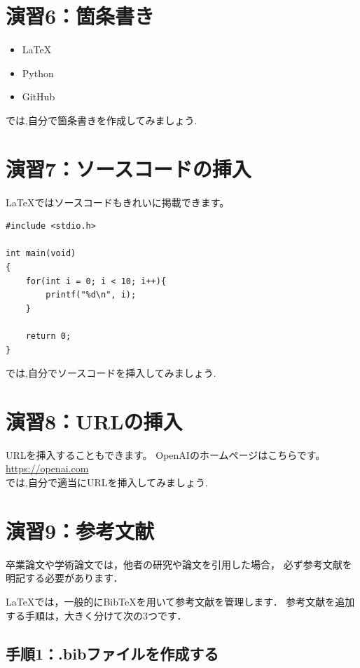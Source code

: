 \documentclass[a4paper,twocolumn]{jsarticle}
\begin{document}
\section*{演習6：箇条書き}
\begin{itemize}
    \item LaTeX
    \item Python
    \item GitHub
\end{itemize}
では,自分で箇条書きを作成してみましょう.\\
\section*{演習7：ソースコードの挿入}

LaTeXではソースコードもきれいに掲載できます。

\begin{lstlisting}
#include <stdio.h>

int main(void)
{
    for(int i = 0; i < 10; i++){
        printf("%d\n", i);
    }

    return 0;
}
\end{lstlisting}
では,自分でソースコードを挿入してみましょう.\\
\section*{演習8：URLの挿入}
URLを挿入することもできます。
OpenAIのホームページはこちらです。\\
\url{https://openai.com}\\
では,自分で適当にURLを挿入してみましょう.\\
\section*{演習9：参考文献}

卒業論文や学術論文では，他者の研究や論文を引用した場合，
必ず参考文献を明記する必要があります．

LaTeXでは，一般的にBibTeXを用いて参考文献を管理します．
参考文献を追加する手順は，大きく分けて次の3つです．

\subsection*{手順1：.bibファイルを作成する}
\end{document}
